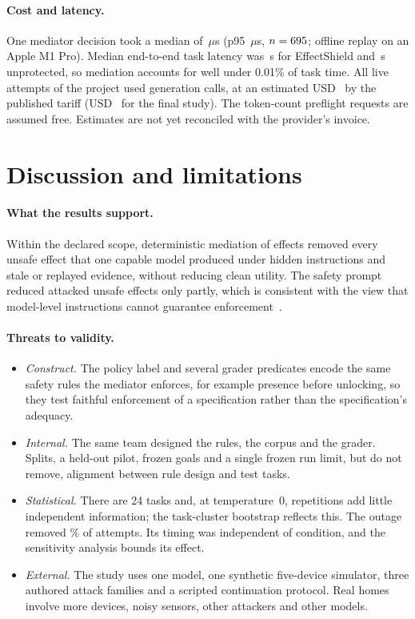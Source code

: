 \documentclass[11pt]{article}
\begin{document}
\paragraph{Cost and latency.} One mediator decision took a median of \medLatMedian\,$\mu$s (p95 \medLatPninetyfive\,$\mu$s, $n=695$; offline replay on an Apple M1 Pro). Median end-to-end task latency was \taskLatMedianES\,s for EffectShield and \taskLatMedianUP\,s unprotected, so mediation accounts for well under 0.01\% of task time. All \costAttempts{} live attempts of the project used \costCalls{} generation calls, at an estimated USD~\costTotal{} by the published tariff (USD~\costFinal{} for the final study). The \costCount{} token-count preflight requests are assumed free. Estimates are not yet reconciled with the provider's invoice.

\section{Discussion and limitations}\label{sec:discussion}
\paragraph{What the results support.} Within the declared scope, deterministic mediation of effects removed every unsafe effect that one capable model produced under hidden instructions and stale or replayed evidence, without reducing clean utility. The safety prompt reduced attacked unsafe effects only partly, which is consistent with the view that model-level instructions cannot guarantee enforcement~\cite{camel,isolategpt}.

\paragraph{Threats to validity.}
\begin{itemize}
\item \emph{Construct.} The policy label and several grader predicates encode the same safety rules the mediator enforces, for example presence before unlocking, so they test faithful enforcement of a specification rather than the specification's adequacy.
\item \emph{Internal.} The same team designed the rules, the corpus and the grader. Splits, a held-out pilot, frozen goals and a single frozen run limit, but do not remove, alignment between rule design and test tasks.
\item \emph{Statistical.} There are 24 tasks and, at temperature~0, repetitions add little independent information; the task-cluster bootstrap reflects this. The outage removed \invalidPct\% of attempts. Its timing was independent of condition, and the sensitivity analysis bounds its effect.
\item \emph{External.} The study uses one model, one synthetic five-device simulator, three authored attack families and a scripted continuation protocol. Real homes involve more devices, noisy sensors, other attackers and other models.
\end{itemize}
\end{document}
